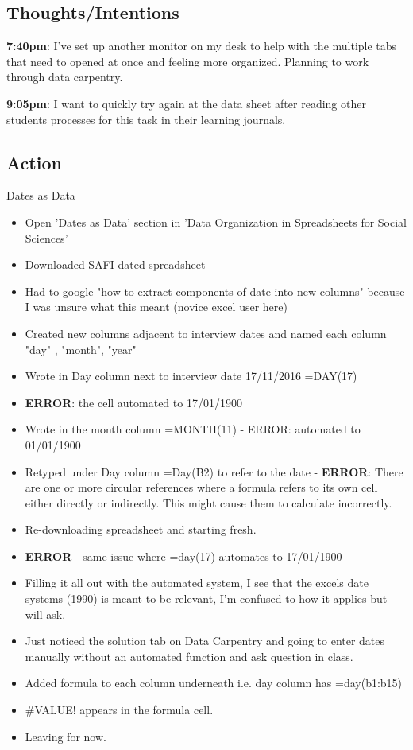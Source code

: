 \documentclass{article}
\begin{document}
\begin{itemize}
\subsection{Thoughts/Intentions}
\textbf{7:40pm}:  I've set up another monitor on my desk to help with the multiple tabs that need to opened at once and feeling more organized. Planning to work through data carpentry.

\textbf{9:05pm}: I want to quickly try again at the data sheet after reading other students processes for this task in their learning journals. 

\subsection{Action}

Dates as Data 
\begin{itemize}
\item Open 'Dates as Data' section in 'Data Organization in Spreadsheets for Social Sciences'
\item Downloaded SAFI dated spreadsheet
\item Had to google "how to extract components of date into new columns" because I was unsure what this meant (novice excel user here)
\item Created new columns adjacent to interview dates and named each column "day" , "month", "year" 
\item Wrote in Day column next to interview date 17/11/2016 =DAY(17) 
\item \textbf{ERROR}: the cell automated to 17/01/1900
\item Wrote in the month column =MONTH(11) - ERROR: automated to 01/01/1900
\item Retyped under Day column =Day(B2) to refer to the date - \textbf{ERROR}: There are one or more circular references where a formula refers to its own cell either directly or indirectly. This might cause them to calculate incorrectly.
\item Re-downloading spreadsheet and starting fresh.
\item \textbf{ERROR} - same issue where =day(17) automates to 17/01/1900
\item Filling it all out with the automated system, I see that the excels date systems (1990) is meant to be relevant, I'm confused to how it applies but will ask.
\item Just noticed the solution tab on Data Carpentry and going to enter dates manually without an automated function and ask question in class.
\item Added formula to each column underneath i.e. day column has =day(b1:b15)
\item #VALUE! appears in the formula cell. 
\item Leaving for now.
\end{itemize}


\end{itemize}
\end{document}
